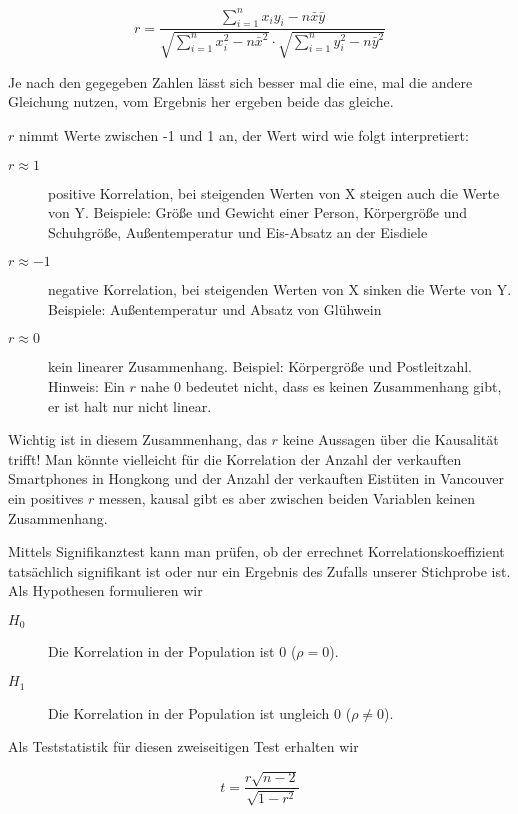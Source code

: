 \documentclass[ngerman, 12pt]{scrartcl}
\begin{document}
\begin{equation}
r = \frac{\sum_{i=1}^n x_iy_i - n\bar{x}\bar{y}}%
{\sqrt{\sum_{i=1}^n x_i^2 - n\bar{x}^2}\cdot \sqrt{\sum_{i=1}^n y_i^2 - n\bar{y}^2}}
\end{equation}

Je nach den gegegeben Zahlen lässt sich besser mal die eine, mal die andere Gleichung nutzen, vom Ergebnis her ergeben beide das gleiche.

\(r\) nimmt Werte zwischen -1 und 1 an, der Wert wird wie folgt interpretiert:

\begin{description}
\item [\(r \approx 1\)] positive Korrelation, bei steigenden Werten von X steigen auch die Werte von Y. Beispiele: Größe und Gewicht einer Person, Körpergröße und Schuhgröße, Außentemperatur und Eis-Absatz an der Eisdiele
\item [\(r \approx -1\)] negative Korrelation, bei steigenden Werten von X sinken die Werte von Y. Beispiele: Außentemperatur und Absatz von Glühwein
\item [\(r \approx 0\)] kein linearer Zusammenhang. Beispiel: Körpergröße und Postleitzahl. Hinweis: Ein \(r\) nahe 0 bedeutet nicht, dass es keinen Zusammenhang gibt, er ist halt nur nicht linear. 
\end{description}

Wichtig ist in diesem Zusammenhang, das \(r\) keine Aussagen über die Kausalität trifft! Man könnte vielleicht für die Korrelation der Anzahl der verkauften Smartphones in Hongkong und der Anzahl der verkauften Eistüten in Vancouver ein positives \(r\) messen, kausal gibt es aber zwischen beiden Variablen keinen Zusammenhang.

Mittels Signifikanztest kann man prüfen, ob der errechnet Korrelationskoeffizient tatsächlich signifikant ist oder nur ein Ergebnis des Zufalls unserer Stichprobe ist. Als Hypothesen formulieren wir

\begin{description}
\item[\(H_0\)] Die Korrelation in der Population ist 0 (\(\rho =0\)).
\item[\(H_1\)] Die Korrelation in der Population ist ungleich 0 (\(\rho\not=0\)).
\end{description}

Als Teststatistik für diesen zweiseitigen Test erhalten wir 

\begin{equation}
t = \frac{r\sqrt{n-2}}{\sqrt{1-r^2}}
\end{equation}
\end{document}
